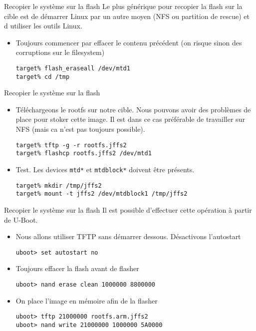 \begin{frame}[fragile=singleslide]{Recopier le système sur la flash}
  Le  plus  générique pour  recopier  la flash  sur  la  cible est  de
  démarrer Linux par un autre moyen  (NFS ou partition de rescue) et d
  utiliser les outils Linux.
  \begin{itemize} 
  \item Toujours commencer par effacer le contenu précédent (on risque
    sinon des corruptions sur le filesystem)
    \begin{lstlisting}
target% flash_eraseall /dev/mtd1
target% cd /tmp
    \end{lstlisting}
  \end{itemize}
\end{frame}

\begin{frame}[fragile=singleslide]{Recopier le système sur la flash}
  \begin{itemize} 
  \item Téléchargeons  le rootfs sur  notre cible. Nous  pouvons avoir
    des problèmes  de place pour stoker  cette image.  Il  est dans ce
    cas préférable de  travailler sur NFS (mais ca  n'est pas toujours
    possible).
    \begin{lstlisting} 
target% tftp -g -r rootfs.jffs2
target% flashcp rootfs.jffs2 /dev/mtd1
    \end{lstlisting}
  \item Test. Les devices \verb+mtd*+ et \verb+mtdblock*+ doivent être présents.
    \begin{lstlisting}
target% mkdir /tmp/jffs2
target% mount -t jffs2 /dev/mtdblock1 /tmp/jffs2
    \end{lstlisting} 
  \end{itemize}
\end{frame}

\begin{frame}[fragile=singleslide]{Recopier le système sur la flash}
  Il est possible d'effectuer cette opération à partir de U-Boot.
  \begin{itemize} 
  \item Nous allons utiliser TFTP sans démarrer dessous. Désactivons l'autostart
    \begin{lstlisting} 
uboot> set autostart no
    \end{lstlisting} 
  \item Toujours effacer la flash avant de flasher
    \begin{lstlisting} 
uboot> nand erase clean 1000000 8800000
    \end{lstlisting} 
  \item On place l'image en mémoire afin de la flasher
    \begin{lstlisting} 
uboot> tftp 21000000 rootfs.arm.jffs2
uboot> nand write 21000000 1000000 5A0000
    \end{lstlisting} 
  \end{itemize}
\end{frame}

